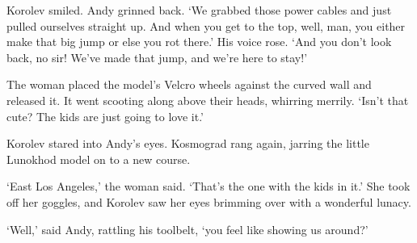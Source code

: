 Korolev smiled. Andy grinned back. `We grabbed those power cables and just pulled ourselves straight up. And when you get to the top, well, man, you either make that big jump or else you rot there.' His voice rose. `And you don't look back, no sir! We've made that jump, and we're here to stay!'

The woman placed the model's Velcro wheels against the curved wall and released it. It went scooting along above their heads, whirring merrily. `Isn't that cute? The kids are just going to love it.'

Korolev stared into Andy's eyes. Kosmograd rang again, jarring the little Lunokhod model on to a new course.

`East Los Angeles,' the woman said. `That's the one with the kids in it.' She took off her goggles, and Korolev saw her eyes brimming over with a wonderful lunacy.

`Well,' said Andy, rattling his toolbelt, `you feel like showing us around?'